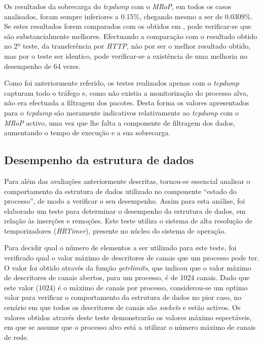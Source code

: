 Os resultados da sobrecarga do \textit{tcpdump} com o \textit{MRoP}, em todos os casos analisados, foram sempre inferiores a 0.15\%, chegando mesmo a ser de 0.0309\%.
Se estes resultados forem comparados com os obtidos em \cite{Farruca:2009}, pode verificar-se que são substancialmente melhores.
Efectuando a comparação com o resultado obtido no 2º teste, da transferência por \textit{HTTP}, não por ser o melhor resultado obtido, mas por o teste ser identico, pode verificar-se a existência de uma melhoria no desempenho de 64 vezes.

Como foi anteriormente referido, os testes realizados apenas com o \textit{tcpdump} capturam todo o tráfego e, como não existia a monitorização do processo alvo, não era efectuada a filtragem dos pacotes.
Desta forma os valores apresentados para o \textit{tcpdump} são meramente indicativos relativamente ao \textit{tcpdump} com o \textit{MRoP} activo, uma vez que lhe falta a componente de filtragem dos dados, aumentando o tempo de execução e a sua sobrecarga.

\subsection{Desempenho da estrutura de dados}

Para além das avaliações anteriormente descritas, tornou-se essencial analisar o comportamento da estrutura de dados utilizado no componente “estado do processo”, de modo a verificar o seu desempenho.
Assim para esta análise, foi elaborado um teste para determinar o desempenho da estrutura de dados, em relação às inserções e remoções.
Este teste utiliza o sistema de alta resolução de temporizadores (\textit{HRTimer})\cite{hrtimerKernel}, presente no núcleo do sistema de operação.

Para decidir qual o número de elementos a ser utilizado para este teste, foi verificado qual o valor máximo de descritores de canais que um processo pode ter.
O valor foi obtido através da função \textit{getrlimits}, que indicou que o valor máximo de descritores de canais abertos, para um processo, é de 1024 canais.
Dado que este valor (1024) é o máximo de canais por processo, considerou-se um optimo valor para verificar o comportamento da estrutura de dados no pior caso, no cenário em que todos os descritores de canais são \textit{sockets} e estão activos.
Os valores obtidos através deste teste demonstrarão os valores máximo espectáveis, em que se assume que o processo alvo está a utilizar o número máximo de canais de rede.

